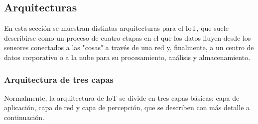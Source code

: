 {\subsection{Arquitecturas}

En esta sección se muestran distintas arquitecturas para el IoT, que suele describirse como un proceso de cuatro etapas en el que los datos fluyen desde los sensores conectados a las "cosas" a través de una red y, finalmente, a un centro de datos corporativo o a la nube para su procesamiento, análisis y almacenamiento.

\subsubsection{Arquitectura de tres capas}

Normalmente, la arquitectura de IoT se divide en tres capas básicas: capa de aplicación, capa de red y capa de percepción, que se describen con más detalle a continuación.

}
